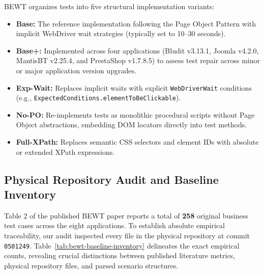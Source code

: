 \documentclass[pdflatex,sn-mathphys-num]{sn-jnl}
\begin{document}
BEWT organizes tests into five structural implementation variants:
\begin{itemize}
    \item \textbf{Base:} The reference implementation following the Page Object Pattern with implicit WebDriver wait strategies (typically set to 10--30 seconds).
    \item \textbf{Base+:} Implemented across four applications (Bludit v3.13.1, Joomla v4.2.0, MantisBT v2.25.4, and PrestaShop v1.7.8.5) to assess test repair across minor or major application version upgrades.
    \item \textbf{Exp-Wait:} Replaces implicit waits with explicit \texttt{WebDriverWait} conditions (e.g., \texttt{ExpectedConditions.elementToBeClickable}).
    \item \textbf{No-PO:} Re-implements tests as monolithic procedural scripts without Page Object abstractions, embedding DOM locators directly into test methods.
    \item \textbf{Full-XPath:} Replaces semantic CSS selectors and element IDs with absolute or extended XPath expressions.
\end{itemize}

\subsection{Physical Repository Audit and Baseline Inventory}

Table 2 of the published BEWT paper \cite{olianas2026bewt} reports a total of \textbf{258} original business test cases across the eight applications. To establish absolute empirical traceability, our audit inspected every file in the physical repository at commit \texttt{0501249}. Table~\ref{tab:bewt-baseline-inventory} delineates the exact empirical counts, revealing crucial distinctions between published literature metrics, physical repository files, and parsed scenario structures.
\end{document}
